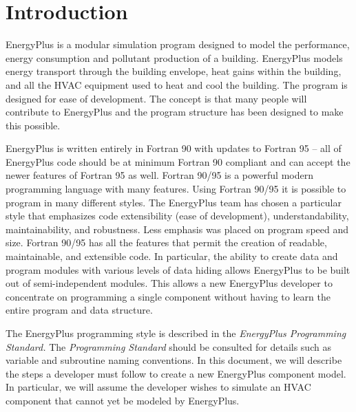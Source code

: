 \chapter{Introduction}\label{introduction}

EnergyPlus is a modular simulation program designed to model the performance, energy consumption and pollutant production of a building. EnergyPlus models energy transport through the building envelope, heat gains within the building, and all the HVAC equipment used to heat and cool the building. The program is designed for ease of development. The concept is that many people will contribute to EnergyPlus and the program structure has been designed to make this possible.

EnergyPlus is written entirely in Fortran 90 with updates to Fortran 95 -- all of EnergyPlus code should be at minimum Fortran 90 compliant and can accept the newer features of Fortran 95 as well. Fortran 90/95 is a powerful modern programming language with many features. Using Fortran 90/95 it is possible to program in many different styles. The EnergyPlus team has chosen a particular style that emphasizes code extensibility (ease of development), understandability, maintainability, and robustness. Less emphasis was placed on program speed and size. Fortran 90/95 has all the features that permit the creation of readable, maintainable, and extensible code. In particular, the ability to create data and program modules with various levels of data hiding allows EnergyPlus to be built out of semi-independent modules. This allows a new EnergyPlus developer to concentrate on programming a single component without having to learn the entire program and data structure.

The EnergyPlus programming style is described in the \emph{EnergyPlus Programming Standard.} The \emph{Programming Standard} should be consulted for details such as variable and subroutine naming conventions. In this document, we will describe the steps a developer must follow to create a new EnergyPlus component model. In particular, we will assume the developer wishes to simulate an HVAC component that cannot yet be modeled by EnergyPlus.
